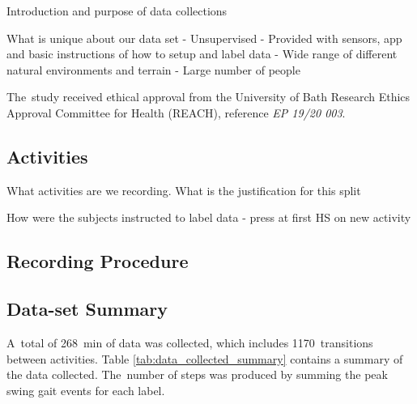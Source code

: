 Introduction and purpose of data collections

What is unique about our data set
- Unsupervised - Provided with sensors, app and basic instructions of how to setup and label data
- Wide range of different natural environments and terrain
- Large number of people

The~study received ethical approval from the University of Bath Research Ethics Approval Committee for Health (REACH), reference \textit{EP 19/20 003}.

\subsection{Activities}
What activities are we recording. What is the justification for this split



How were the subjects instructed to label data - press at first HS on new activity

\subsection{Recording Procedure}
% 



\subsection{Data-set Summary} 
 A~total of 268~min  of data was collected, which includes 1170~transitions between activities. Table \ref{tab:data_collected_summary} contains a summary of the data collected. The~number of steps was produced by summing the peak swing gait events for each label.

